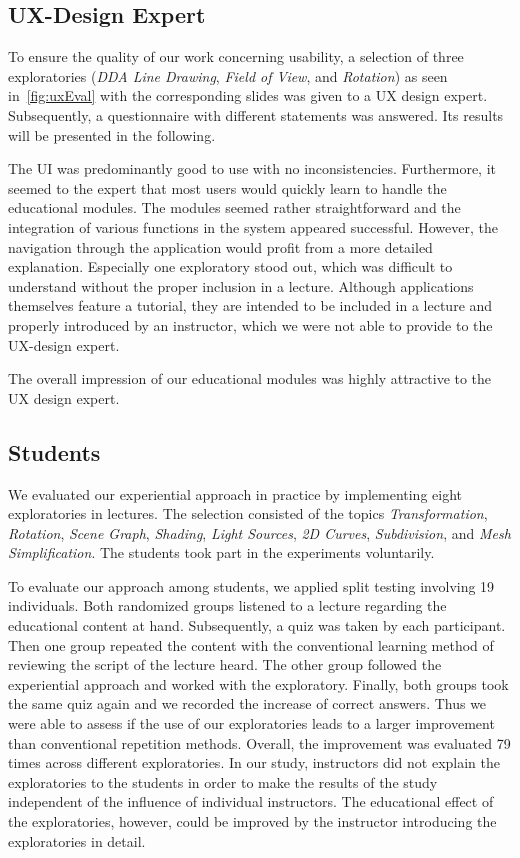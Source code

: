 \subsection{UX-Design Expert} %
To ensure the quality of our work concerning usability, a selection of three exploratories (\emph{DDA Line Drawing}, \emph{Field of View}, and \emph{Rotation}) as seen in~\autoref{fig:uxEval} with the corresponding slides was given to a UX design expert. Subsequently, a questionnaire with different statements was answered. Its results will be presented in the following.

The UI was predominantly good to use with no inconsistencies. Furthermore, it seemed to the expert that most users would quickly learn to handle the educational modules. The modules seemed rather straightforward and the integration of various functions in the system appeared successful. However, the navigation through the application would profit from a more detailed explanation. Especially one exploratory stood out, which was difficult to understand without the proper inclusion in a lecture. Although applications themselves feature a tutorial, they are intended to be included in a lecture and properly introduced by an instructor, which we were not able to provide to the UX-design expert. %

The overall impression of our educational modules was highly attractive to the UX design expert.

\subsection{Students} %
We evaluated our experiential approach in practice by implementing eight exploratories in lectures. The selection consisted of the topics \textit{Transformation}, \textit{Rotation}, \textit{Scene Graph}, \textit{Shading}, \textit{Light Sources}, \textit{2D Curves}, \textit{Subdivision}, and \textit{Mesh Simplification}. The students took part in the experiments voluntarily.

To evaluate our approach among students, we applied split testing involving 19 individuals. Both randomized groups listened to a lecture regarding the educational content at hand. Subsequently, a quiz was taken by each participant. Then one group repeated the content with the conventional learning method of reviewing the script of the lecture heard. The other group followed the experiential approach and worked with the exploratory. Finally, both groups took the same quiz again and we recorded the increase of correct answers. Thus we were able to assess if the use of our exploratories leads to a larger improvement than conventional repetition methods. Overall, the improvement was evaluated 79 times across different exploratories. In our study, instructors did not explain the exploratories to the students in order to make the results of the study independent of the influence of individual instructors. The educational effect of the exploratories, however, could be improved by the instructor introducing the exploratories in detail.


